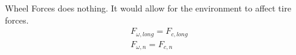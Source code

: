 \documentclass[../SimBALink.tex]{subfiles}
\begin{document}
Wheel Forces does nothing. It would allow for the environment to affect tire forces.
\begin{gather}
F_{\omega,long} = F_{c,long} \\
F_{\omega,n} = F_{c,n}
\end{gather}
\end{document}
